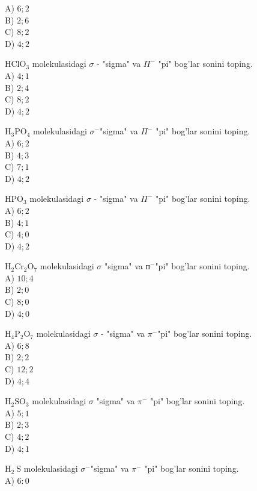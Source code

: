 A) $6 ; 2$\\
B) $2 ; 6$\\
C) $8 ; 2$\\
D) $4 ; 2$
  \item $\mathrm{HClO}_{3}$ molekulasidagi $\sigma$ - "sigma" va $\Pi^{-}$ "pi" bog'lar sonini toping.\\
A) $4 ; 1$\\
B) $2 ; 4$\\
C) $8 ; 2$\\
D) $4 ; 2$
  \item $\mathrm{H}_{3} \mathrm{PO}_{4}$ molekulasidagi $\sigma^{-}$"sigma" va $\Pi^{-}$ "pi" bog'lar sonini toping.\\
A) $6 ; 2$\\
B) $4 ; 3$\\
C) $7 ; 1$\\
D) $4 ; 2$
  \item $\mathrm{HPO}_{3}$ molekulasidagi $\sigma$ - "sigma" va $\Pi^{-}$ "pi" bog'lar sonini toping.\\
A) $6 ; 2$\\
B) $4 ; 1$\\
C) $4 ; 0$\\
D) $4 ; 2$
  \item $\mathrm{H}_{2} \mathrm{Cr}_{2} \mathrm{O}_{7}$ molekulasidagi $\sigma$ "sigma" va $п^{-}$"pi" bog'lar sonini toping.\\
A) $10 ; 4$\\
B) $2 ; 0$\\
C) $8 ; 0$\\
D) $4 ; 0$
  \item $\mathrm{H}_{4} \mathrm{P}_{2} \mathrm{O}_{7}$ molekulasidagi $\sigma$ - "sigma" va $\pi^{-}$"pi" bog'lar sonini toping.\\
A) $6 ; 8$\\
B) $2 ; 2$\\
C) $12 ; 2$\\
D) $4 ; 4$
  \item $\mathrm{H}_{2} \mathrm{SO}_{3}$ molekulasidagi $\sigma$ "sigma" va $\pi^{-}$ "pi" bog'lar sonini toping.\\
A) $5 ; 1$\\
B) $2 ; 3$\\
C) $4 ; 2$\\
D) $4 ; 1$
  \item $\mathrm{H}_{2} \mathrm{~S}$ molekulasidagi $\sigma^{-}$"sigma" va $\pi^{-}$ "pi" bog'lar sonini toping.\\
A) $6: 0$\\
